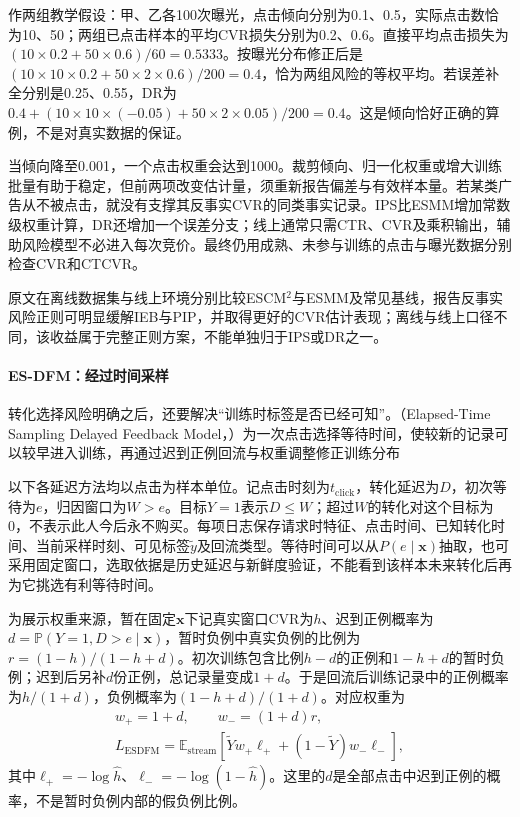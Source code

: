 作两组教学假设：甲、乙各100次曝光，点击倾向分别为0.1、0.5，实际点击数恰为10、50；两组已点击样本的平均CVR损失分别为0.2、0.6。直接平均点击损失为$(10\times0.2+50\times0.6)/60=0.5333$。按曝光分布修正后是$(10\times10\times0.2+50\times2\times0.6)/200=0.4$，恰为两组风险的等权平均。若误差补全分别是0.25、0.55，DR为$0.4+(10\times10\times(-0.05)+50\times2\times0.05)/200=0.4$。这是倾向恰好正确的算例，不是对真实数据的保证。

当倾向降至0.001，一个点击权重会达到1000。裁剪倾向、归一化权重或增大训练批量有助于稳定，但前两项改变估计量，须重新报告偏差与有效样本量。若某类广告从不被点击，就没有支撑其反事实CVR的同类事实记录。IPS比ESMM增加常数级权重计算，DR还增加一个误差分支；线上通常只需CTR、CVR及乘积输出，辅助风险模型不必进入每次竞价。最终仍用成熟、未参与训练的点击与曝光数据分别检查CVR和CTCVR。

原文在离线数据集与线上环境分别比较ESCM$^2$与ESMM及常见基线，报告反事实风险正则可明显缓解IEB与PIP，并取得更好的CVR估计表现；离线与线上口径不同，该收益属于完整正则方案，不能单独归于IPS或DR之一。

\paragraph{ES-DFM：经过时间采样}
\label{sec:rs-advertising-esdfm}

转化选择风险明确之后，还要解决“训练时标签是否已经可知”。（Elapsed-Time Sampling Delayed Feedback Model，）为一次点击选择等待时间，使较新的记录可以较早进入训练，再通过迟到正例回流与权重调整修正训练分布

以下各延迟方法均以点击为样本单位。记点击时刻为$t_{\mathrm{click}}$，转化延迟为$D$，初次等待为$e$，归因窗口为$W>e$。目标$Y=1$表示$D\leq W$；超过$W$的转化对这个目标为0，不表示此人今后永不购买。每项日志保存请求时特征、点击时间、已知转化时间、当前采样时刻、可见标签$\widetilde y$及回流类型。等待时间可以从$P(e\mid\bm{x})$抽取，也可采用固定窗口，选取依据是历史延迟与新鲜度验证，不能看到该样本未来转化后再为它挑选有利等待时间。

为展示权重来源，暂在固定$\bm{x}$下记真实窗口CVR为$h$、迟到正例概率为$d=\mathbb{P}(Y=1,D>e\mid\bm{x})$，暂时负例中真实负例的比例为$r=(1-h)/(1-h+d)$。初次训练包含比例$h-d$的正例和$1-h+d$的暂时负例；迟到后另补$d$份正例，总记录量变成$1+d$。于是回流后训练记录中的正例概率为$h/(1+d)$，负例概率为$(1-h+d)/(1+d)$。对应权重为
\begin{equation}
  \begin{gathered}
    w_+=1+d,\qquad w_-=(1+d)r,\\
    L_{\mathrm{ESDFM}}
    =\mathbb{E}_{\mathrm{stream}}
      [\widetilde Yw_+\ell_+
        +(1-\widetilde Y)w_-\ell_-],
  \end{gathered}
  \label{eq:rs-advertising-esdfm}
\end{equation}
其中$\ell_+=-\log\widehat h$、$\ell_-=-\log(1-\widehat h)$。这里的$d$是全部点击中迟到正例的概率，不是暂时负例内部的假负例比例。

